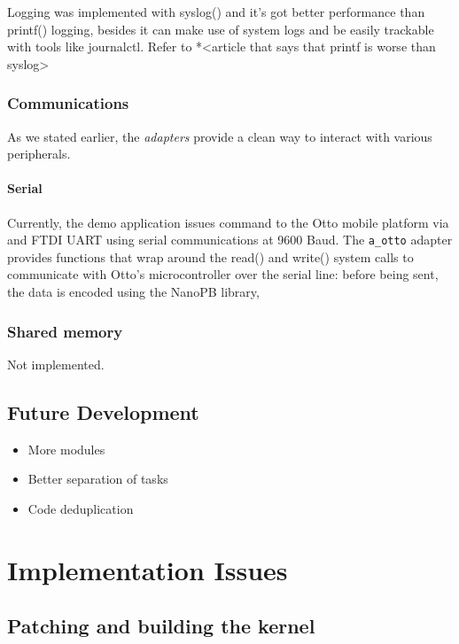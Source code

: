 \documentclass[a4paper,12pt]{report}
\begin{document}
Logging was implemented with syslog() and it's got better performance than printf() logging, besides it can make use of system logs and be easily trackable with tools like journalctl. Refer to *<article that says that printf is worse than syslog>

\subsection{Communications}

As we stated earlier, the \textit{adapters} provide a clean way to interact with various peripherals.

\subsubsection{Serial}

Currently, the demo application issues command to the Otto mobile platform via and FTDI UART using serial communications at 9600 Baud. The \texttt{a\_otto} adapter provides functions that wrap around the read() and write() system calls to communicate with Otto's microcontroller over the serial line: before being sent, the data is encoded using the NanoPB library,  

\subsection{Shared memory}

Not implemented.

\section{Future Development}

\begin{itemize}
    \item More modules
    \item Better separation of tasks
    \item Code deduplication
\end{itemize}

\newpage
\chapter{Implementation Issues}
\section{Patching and building the kernel}
\end{document}
